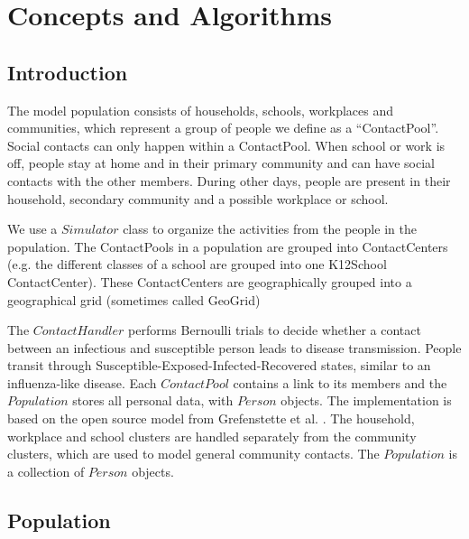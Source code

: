 \chapter{Concepts and Algorithms}
\label{chap:code}


\section{Introduction}
\label{section:ConceptsIntro}

The model population consists of households, schools, workplaces and
communities, which represent a group of people we define as a ``ContactPool''.
Social contacts can only happen within a ContactPool.
When school or work is off, people stay at home and in their primary
community and can have social contacts with the other members.
During other days, people are present in their household, secondary community
and a possible workplace or school.  



We use a $Simulator$ class to organize the activities from the people in the population.
The ContactPools in a population are grouped into ContactCenters (e.g. the different classes of a school are grouped into one K12School ContactCenter).
These ContactCenters are geographically grouped into a geographical grid (sometimes called GeoGrid)

The $Contact Handler$ performs Bernoulli trials to decide whether a contact
between an infectious and susceptible person leads to disease transmission. 
People transit through Susceptible-Exposed-Infected-Recovered states,
similar to an influenza-like disease.
Each $ContactPool$ contains a link to its members and the $Population$ stores all personal
data, with $Person$ objects.
The implementation is based on the open source model from Grefenstette et al. \cite{grefenstette2013}. 
The household, workplace and school clusters are handled separately from the
community clusters, which are used to model general community contacts. The
$Population$ is a collection of $Person$ objects.



\section{Population }
\label{section:gengeopop}


